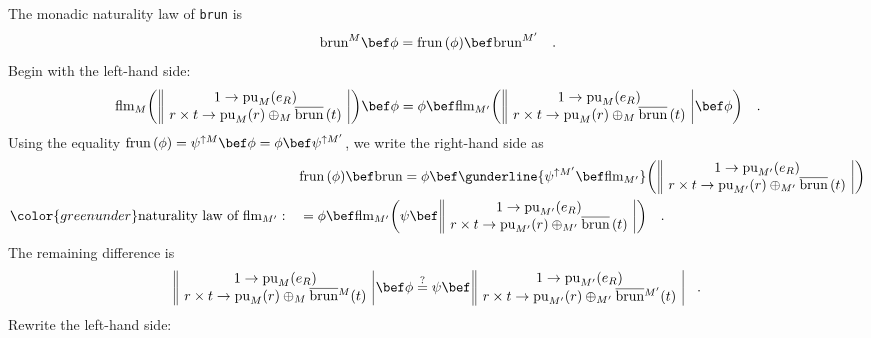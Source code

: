 The monadic naturality law of \lstinline!brun! is
\[
\text{brun}^{M}\bef\phi=\text{frun}\,(\phi)\bef\text{brun}^{M^{\prime}}\quad.
\]
Begin with the left-hand side:
\[
\text{flm}_{M}\bigg(\,\begin{array}{||c|}
1\rightarrow\text{pu}_{M}(e_{R})\\
r\times t\rightarrow\text{pu}_{M}(r)\oplus_{M}\overline{\text{brun}}\,(t)
\end{array}\,\bigg)\bef\phi=\phi\bef\text{flm}_{M^{\prime}}\bigg(\,\begin{array}{||c|}
1\rightarrow\text{pu}_{M}(e_{R})\\
r\times t\rightarrow\text{pu}_{M}(r)\oplus_{M}\overline{\text{brun}}\,(t)
\end{array}\,\bef\phi\bigg)\quad.
\]
Using the equality $\text{frun}\,(\phi)=\psi^{\uparrow M}\bef\phi=\phi\bef\psi^{\uparrow M^{\prime}}$,
we write the right-hand side as
\begin{align*}
 & \text{frun}\,(\phi)\bef\text{brun}=\phi\bef\gunderline{\psi^{\uparrow M^{\prime}}\bef\text{flm}_{M^{\prime}}}\bigg(\,\begin{array}{||c|}
1\rightarrow\text{pu}_{M^{\prime}}(e_{R})\\
r\times t\rightarrow\text{pu}_{M^{\prime}}(r)\oplus_{M^{\prime}}\overline{\text{brun}}\,(t)
\end{array}\,\bigg)\\
{\color{greenunder}\text{naturality law of }\text{flm}_{M^{\prime}}:}\quad & =\phi\bef\text{flm}_{M^{\prime}}\bigg(\psi\bef\,\begin{array}{||c|}
1\rightarrow\text{pu}_{M^{\prime}}(e_{R})\\
r\times t\rightarrow\text{pu}_{M^{\prime}}(r)\oplus_{M^{\prime}}\overline{\text{brun}}\,(t)
\end{array}\,\bigg)\quad.
\end{align*}
The remaining difference is
\[
\begin{array}{||c|}
1\rightarrow\text{pu}_{M}(e_{R})\\
r\times t\rightarrow\text{pu}_{M}(r)\oplus_{M}\overline{\text{brun}}{}^{M}(t)
\end{array}\,\bef\phi\overset{?}{=}\psi\bef\,\begin{array}{||c|}
1\rightarrow\text{pu}_{M^{\prime}}(e_{R})\\
r\times t\rightarrow\text{pu}_{M^{\prime}}(r)\oplus_{M^{\prime}}\overline{\text{brun}}{}^{M^{\prime}}(t)
\end{array}\quad.
\]
Rewrite the left-hand side:
